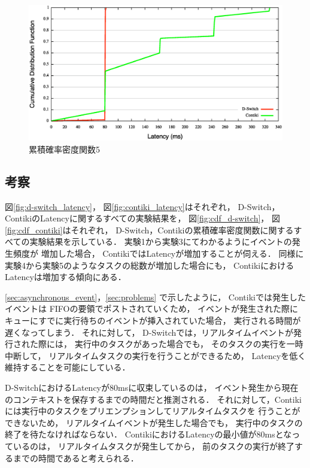 \begin{figure}[htbp]
 \begin{center}
  \includegraphics[width=120mm]{./images/cdf5.eps}
 \end{center}
 \caption{累積確率密度関数5}
 \label{fig:cdf5}
\end{figure}

\subsection{考察}\label{sec:rt_discussion}
図\ref{fig:d-switch_latency}，
図\ref{fig:contiki_latency}はそれぞれ，
D-Switch，ContikiのLatencyに関するすべての実験結果を，
図\ref{fig:cdf_d-switch}，
図\ref{fig:cdf_contiki}はそれぞれ，
D-Switch，Contikiの累積確率密度関数に関するすべての実験結果を示している．
実験1から実験3にてわかるようにイベントの発生頻度が
増加した場合，
ContikiではLatencyが増加することが伺える．
同様に実験4から実験5のようなタスクの総数が増加した場合にも，
ContikiにおけるLatencyは増加する傾向にある．

\ref{sec:asynchronous_event}，\ref{sec:problems}
で示したように，
Contikiでは発生したイベントは
FIFOの要領でポストされていくため，
イベントが発生された際に
キューにすでに実行待ちのイベントが挿入されていた場合，
実行される時間が遅くなってしまう．
それに対して，
D-Switchでは，リアルタイムイベントが発行された際には，
実行中のタスクがあった場合でも，
そのタスクの実行を一時中断して，
リアルタイムタスクの実行を行うことができるため，
Latencyを低く維持することを可能にしている．

D-SwitchにおけるLatencyが80msに収束しているのは，
イベント発生から現在のコンテキストを保存するまでの時間だと推測される．
それに対して，Contikiには実行中のタスクをプリエンプションしてリアルタイムタスクを
行うことができないため，
リアルタイムイベントが発生した場合でも，
実行中のタスクの終了を待たなければならない．
ContikiにおけるLatencyの最小値が80msとなっているのは，
リアルタイムタスクが発生してから，
前のタスクの実行が終了するまでの時間であると考えられる．


